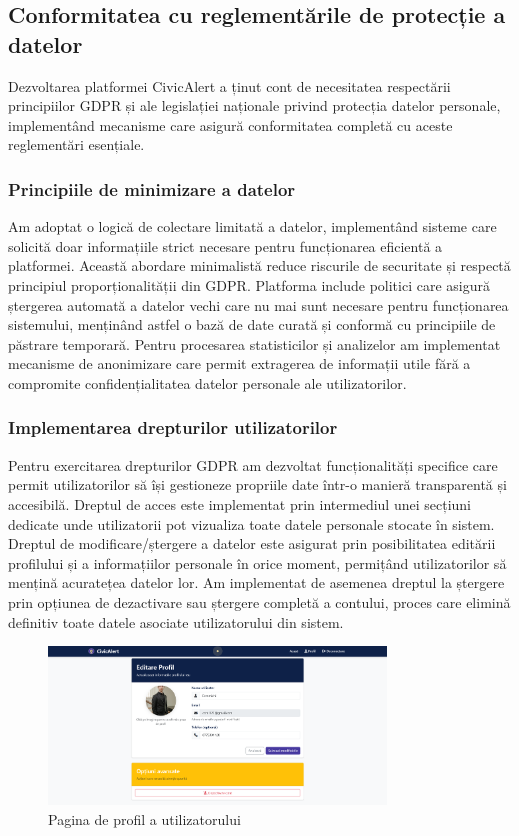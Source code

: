 \documentclass[12pt,a4paper]{report}
\begin{document}
\subsection{Conformitatea cu reglementările de protecție a datelor}
Dezvoltarea platformei CivicAlert a ținut cont de necesitatea respectării principiilor GDPR și ale legislației naționale privind protecția datelor personale, implementând mecanisme care asigură conformitatea completă cu aceste reglementări esențiale.
\subsubsection{Principiile de minimizare a datelor}
Am adoptat o logică de colectare limitată a datelor, implementând sisteme care solicită doar informațiile strict necesare pentru funcționarea eficientă a platformei. Această abordare minimalistă reduce riscurile de securitate și respectă principiul proporționalității din GDPR.
Platforma include politici  care asigură ștergerea automată a datelor vechi care nu mai sunt necesare pentru funcționarea sistemului, menținând astfel o bază de date curată și conformă cu principiile de păstrare temporară. Pentru procesarea statisticilor și analizelor am implementat mecanisme de anonimizare care permit extragerea de informații utile fără a compromite confidențialitatea datelor personale ale utilizatorilor.
\subsubsection{Implementarea drepturilor utilizatorilor}
Pentru exercitarea drepturilor GDPR am dezvoltat funcționalități specifice care permit utilizatorilor să își gestioneze propriile date într-o manieră transparentă și accesibilă. Dreptul de acces este implementat prin intermediul unei secțiuni dedicate unde utilizatorii pot vizualiza toate datele personale stocate în sistem.
Dreptul de modificare/ștergere a datelor este asigurat prin posibilitatea editării profilului și a informațiilor personale în orice moment, permițând utilizatorilor să mențină acuratețea datelor lor. Am implementat de asemenea dreptul la ștergere prin opțiunea de dezactivare sau ștergere completă a contului, proces care elimină definitiv toate datele asociate utilizatorului din sistem.

\begin{figure}[H]
    \centering
    \includegraphics[width=0.8\textwidth]{poza_profil.png}
    \caption{Pagina de profil a utilizatorului}
    \label{fig:profil}
\end{figure}
\end{document}
